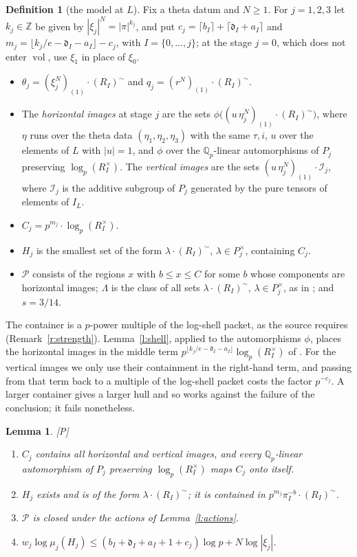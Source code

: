 \documentclass[11pt]{article}
\theoremstyle{plain}
\newtheorem{lemma}[theorem]{Lemma}
\theoremstyle{definition}
\newtheorem{definition}[theorem]{Definition}
\theoremstyle{remark}
\newcommand{\Pmark}{\textup{[P]}}
\newcommand{\vol}{\operatorname{vol}}
\newcommand{\Poss}{\mathcal P}
\newcommand{\Qp}[1]{\mathbb Q_{#1}}
\newcommand{\tI}{(R_I)^{\sim}}
\begin{document}
\begin{definition}[the model at $L$]\label{d:actual}
Fix a theta datum and $N\ge1$. For $j=1,2,3$ let $k_j\in\mathbb Z$ be given by
$|\xi_j|^N=|\pi|^{k_j}$, and put
$c_j=\lceil b_I\rceil+\lceil\mathfrak d_I+a_I\rceil$ and
$m_j=\lfloor k_j/e-\mathfrak d_I-a_I\rfloor-c_j$, with $I=\{0,\dots,j\}$; at the stage
$j=0$, which does not enter $\vol$, use $\xi_1$ in place of $\xi_0$.
\begin{itemize}[leftmargin=2em]
\item $\theta_j=(\xi_j^N)_{(1)}\cdot\tI$ and $q_j=(r^N)_{(1)}\cdot\tI$.
\item The \emph{horizontal images} at stage $j$ are the sets
  $\phi\bigl((u\,\eta_j^N)_{(1)}\cdot\tI\bigr)$, where $\eta$ runs over the theta data
  $(\eta_1,\eta_2,\eta_3)$ with the same $\tau,i$, $u$ over the elements of $L$ with $|u|=1$,
  and $\phi$ over the $\Qp p$-linear automorphisms of $P_j$ preserving $\log_p(R_I^\times)$.
  The \emph{vertical images} are the sets $(u\,\eta_j^N)_{(1)}\cdot\mathcal I_j$, where
  $\mathcal I_j$ is the additive subgroup of $P_j$ generated by the pure tensors of
  elements of $I_L$.
\item $C_j=p^{m_j}\cdot\log_p(R_I^\times)$.
\item $H_j$ is the smallest set of the form $\lambda\cdot\tI$, $\lambda\in P_j^\times$,
  containing $C_j$.
\item $\Poss$ consists of the regions $x$ with $b\le x\le C$ for some $b$ whose components
  are horizontal images; $\Lambda$ is the class of all sets $\lambda\cdot\tI$,
  $\lambda\in P_j^\times$, as in \cite[Rem.~3.9.5(i)]{IUT3}; and $s=3/14$.
\end{itemize}
\end{definition}

The container is a $p$-power multiple of the log-shell packet, as the source requires
(Remark~\ref{r:strength}). Lemma~\ref{l:shell}, applied to the automorphisms $\phi$, places
the horizontal images in the middle term
$p^{\lfloor k_j/e-\mathfrak d_I-a_I\rfloor}\log_p(R_I^\times)$ of \cite[Prop.~1.4(iii)]{IUT4}.
For the vertical images we only use their containment in the right-hand term, and passing
from that term back to a multiple of the log-shell packet costs the factor $p^{-c_j}$. A
larger container gives a larger hull and so works against the failure of the conclusion;
it fails nonetheless.

\begin{lemma}\label{l:actualregions}
\Pmark{}
\begin{enumerate}[label=(\alph*)]
\item $C_j$ contains all horizontal and vertical images, and every $\Qp p$-linear
  automorphism of $P_j$ preserving $\log_p(R_I^\times)$ maps $C_j$ onto itself.
\item $H_j$ exists and is of the form $\lambda\cdot\tI$; it is contained in
  $p^{m_j}\pi_I^{-b}\cdot\tI$.
\item $\Poss$ is closed under the actions of Lemma~\ref{l:actions}.
\item $w_j\log\mu_j(H_j)\le(b_I+\mathfrak d_I+a_I+1+c_j)\log p+N\log|\xi_j|$.
\end{enumerate}
\end{lemma}
\end{document}
